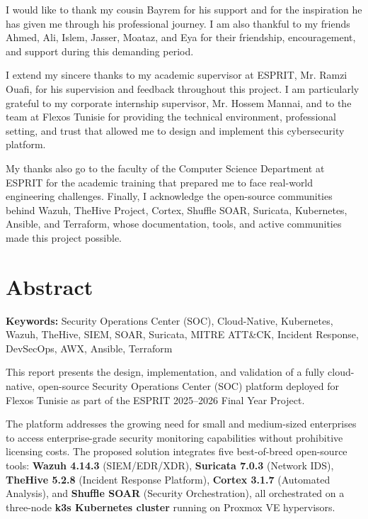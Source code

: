 \documentclass[12pt,a4paper]{report}
\begin{document}
I would like to thank my cousin Bayrem for his support and for the inspiration he has given me through his professional journey. I am also thankful to my friends Ahmed, Ali, Islem, Jasser, Moataz, and Eya for their friendship, encouragement, and support during this demanding period.

I extend my sincere thanks to my academic supervisor at ESPRIT, Mr. Ramzi Ouafi, for his supervision and feedback throughout this project. I am particularly grateful to my corporate internship supervisor, Mr. Hossem Mannai, and to the team at Flexos Tunisie for providing the technical environment, professional setting, and trust that allowed me to design and implement this cybersecurity platform.

My thanks also go to the faculty of the Computer Science Department at ESPRIT for the academic training that prepared me to face real-world engineering challenges. Finally, I acknowledge the open-source communities behind Wazuh, TheHive Project, Cortex, Shuffle SOAR, Suricata, Kubernetes, Ansible, and Terraform, whose documentation, tools, and active communities made this project possible.
\newpage
\chapter*{Abstract}

\textbf{Keywords:} Security Operations Center (SOC), Cloud-Native, Kubernetes, Wazuh, TheHive, SIEM, SOAR, Suricata, MITRE ATT\&CK, Incident Response, DevSecOps, AWX, Ansible, Terraform

\vspace{0.5cm}

This report presents the design, implementation, and validation of a fully cloud-native, open-source Security Operations Center (SOC) platform deployed for Flexos Tunisie as part of the ESPRIT 2025--2026 Final Year Project.

The platform addresses the growing need for small and medium-sized enterprises to access enterprise-grade security monitoring capabilities without prohibitive licensing costs. The proposed solution integrates five best-of-breed open-source tools: \textbf{Wazuh 4.14.3} (SIEM/EDR/XDR), \textbf{Suricata 7.0.3} (Network IDS), \textbf{TheHive 5.2.8} (Incident Response Platform), \textbf{Cortex 3.1.7} (Automated Analysis), and \textbf{Shuffle SOAR} (Security Orchestration), all orchestrated on a three-node \textbf{k3s Kubernetes cluster} running on Proxmox VE hypervisors.
\end{document}
